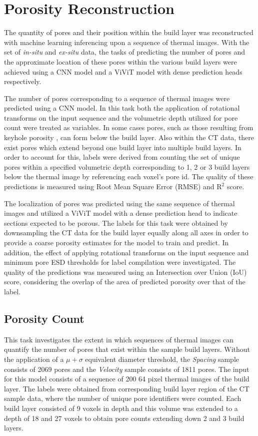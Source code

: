 \section{Porosity Reconstruction}
The quantity of pores and their position within the build layer was
reconstructed with machine learning inferencing upon a sequence of thermal
images.  With the set of \textit{in-situ} and \textit{ex-situ} data, the tasks
of predicting the number of pores and the approximate location of these pores
within the various build layers were achieved using a CNN model and a ViViT
model with dense prediction heads respectively.

The number of pores corresponding to a sequence of thermal images were predicted
using a CNN model. In this task both the application of rotational transforms on
the input sequence and the volumetric depth utilized for pore count were treated
as variables. In some cases pores, such as those resulting from keyhole porosity
\cite{wang_mechanism_2022}, can form below the build layer. Also within the CT
data, there exist pores which extend beyond one build layer into multiple
build layers. In order to account for this, labels were derived from counting
the set of unique pores within a specified volumetric depth corresponding to 1,
2 or 3 build layers below the thermal image by referencing each voxel's pore id.
The quality of these predictions is measured using Root Mean Square Error (RMSE)
and $\text{R}^2$ score.

The localization of pores was predicted using the same sequence of thermal
images and utilized a ViViT model with a dense prediction head to indicate
sections expected to be porous. The labels for this task were obtained by
downsampling the CT data for the build layer equally along all axes in order to
provide a coarse porosity estimates for the model to train and predict. In
addition, the effect of applying rotational transforms on the input sequence and
minimum pore ESD thresholds for label compilation were investigated. The quality
of the predictions was measured using an Intersection over Union (IoU) score,
considering the overlap of the area of predicted porosity over that of the
label.

\subsection{Porosity Count}
This task investigates the extent in which sequences of thermal images can
quantify the number of pores that exist within the sample build layers. Without
the application of a $\mu + \sigma$ equivalent diameter threshold, the
\textit{Spacing} sample consists of 2069 pores and the \textit{Velocity} sample
consists of 1811 pores. The input for this model consists of a sequence of 200
64 \texttimes{} pixel thermal images of the build layer. The labels were
obtained from corresponding build layer region of the CT sample data, where the
number of unique pore identifiers were counted. Each build layer consisted
of 9 voxels in depth and this volume was extended to a depth of 18 and 27 voxels
to obtain pore counts extending down 2 and 3 build layers.

